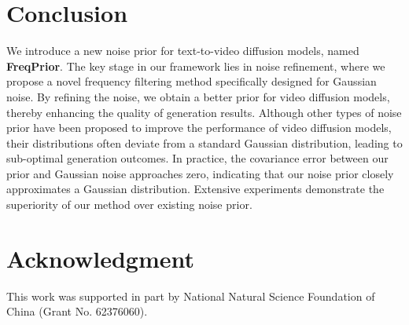 \section{Conclusion}
\label{sec:conclusion}
We introduce a new noise prior for text-to-video diffusion models, named \textbf{FreqPrior}. 
The key stage in our framework lies in noise refinement, where we propose a novel frequency filtering method specifically designed for Gaussian noise.
By refining the noise, we obtain a better prior for video diffusion models, thereby enhancing the quality of generation results.
Although other types of noise prior have been proposed to improve the performance of video diffusion models, their distributions often deviate from a standard Gaussian distribution, leading to sub-optimal generation outcomes.
In practice, the covariance error between our prior and Gaussian noise approaches zero, indicating that our noise prior closely approximates a Gaussian distribution. 
Extensive experiments demonstrate the superiority of our method over existing noise prior.

\section*{Acknowledgment}
This work was supported in part by National Natural Science Foundation of China (Grant No. 62376060).




